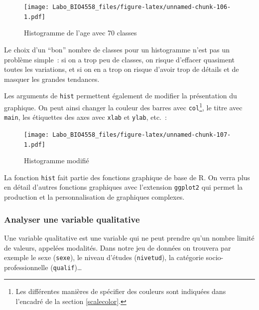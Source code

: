 \documentclass[12pt,]{book}
\newenvironment{Shaded}{\begin{snugshade}}{\end{snugshade}}
\newcommand{\DataTypeTok}[1]{\textcolor[rgb]{0.13,0.29,0.53}{#1}}
\newcommand{\KeywordTok}[1]{\textcolor[rgb]{0.13,0.29,0.53}{\textbf{#1}}}
\newcommand{\NormalTok}[1]{#1}
\newcommand{\OperatorTok}[1]{\textcolor[rgb]{0.81,0.36,0.00}{\textbf{#1}}}
\newcommand{\StringTok}[1]{\textcolor[rgb]{0.31,0.60,0.02}{#1}}
\begin{document}
\begin{figure}
\centering
\texttt{[image: Labo\_BIO4558\_files/figure-latex/unnamed-chunk-106-1.pdf]}
\caption{\label{fig:unnamed-chunk-106}Histogramme de l'age avec 70 classes}
\end{figure}

Le choix d'un ``bon'' nombre de classes pour un histogramme n'est pas un problème simple~: si on a trop peu de classes, on risque d'effacer quasiment toutes les variations, et si on en a trop on risque d'avoir trop de détails et de masquer les grandes tendances.

Les arguments de \texttt{hist} permettent également de modifier la présentation du graphique. On peut ainsi changer la couleur des barres avec \texttt{col}\footnote{Les différentes manières de spécifier des couleurs sont indiquées dans l'encadré de la section \ref{scalecolor}.}, le titre avec \texttt{main}, les étiquettes des axes avec \texttt{xlab} et \texttt{ylab}, etc.~:

\begin{Shaded}
\end{Shaded}

\begin{figure}
\centering
\texttt{[image: Labo\_BIO4558\_files/figure-latex/unnamed-chunk-107-1.pdf]}
\caption{\label{fig:unnamed-chunk-107}Histogramme modifié}
\end{figure}

La fonction \texttt{hist} fait partie des fonctions graphique de base de R. On verra plus en détail d'autres fonctions graphiques
avec l'extension \texttt{ggplot2} qui permet la production et la personnalisation de graphiques complexes.

\hypertarget{analyser-une-variable-qualitative}{%
\subsubsection{Analyser une variable qualitative}\label{analyser-une-variable-qualitative}}

Une variable qualitative est une variable qui ne peut prendre qu'un nombre limité de valeurs, appelées modalités. Dans notre jeu de données on trouvera par exemple le sexe (\texttt{sexe}), le niveau d'études (\texttt{nivetud}), la catégorie socio-professionnelle (\texttt{qualif})\ldots{}
\end{document}
